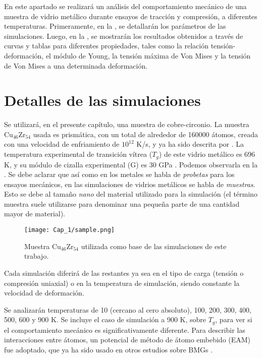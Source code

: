 En este apartado se realizará un análisis del comportamiento mecánico de una muestra de vidrio metálico durante ensayos de tracción y compresión, a diferentes temperaturas. Primeramente, en la , se detallarán los parámetros de las simulaciones. Luego, en la , se mostrarán los resultados obtenidos a través de curvas y tablas para diferentes propiedades, tales como la relación tensión-deformación, el módulo de Young, la tensión máxima de Von Mises y la tensión de Von Mises a una determinada deformación.

\section{Detalles de las simulaciones}
\label{S3_2}

Se utilizará, en el presente capítulo, una muestra de cobre-circonio. La muestra Cu$_{46}$Zr$_{54}$ usada es prismática, con un total de alrededor de 160000 átomos, creada con una velocidad de enfriamiento de $10^{12}$ K/s, y ya ha sido descrita por \cite{arman10}. La temperatura experimental de transición vítrea ($T_g$) de este vidrio metálico es 696 K, y su módulo de cizalla experimental (G) es 30 GPa \citep{johnson05}. Podemos observarla en la . Se debe aclarar que así como en los metales se habla de \textit{probetas} para los ensayos mecánicos, en las simulaciones de vidrios metálicos se habla de \textit{muestras}. Esto se debe al tamaño \textit{nano} del material utilizado para la simulación (el término muestra suele utilizarse para denominar una pequeña parte de una cantidad mayor de material).

\begin{figure}
 \centering
 \texttt{[image: Cap\_1/sample.png]}
 \caption[Muestra utilizada en el trabajo]{Muestra Cu$_{46}$Zr$_{54}$ utilizada como base de las simulaciones de este trabajo.}
 \label{C3:fg:sample}
\end{figure}

Cada simulación diferirá de las restantes ya sea en el tipo de carga (tensión o compresión uniaxial) o en la temperatura de simulación, siendo constante la velocidad de deformación.

Se analizarán temperaturas de 10 (cercano al cero absoluto), 100, 200, 300, 400, 500, 600 y 900 K. Se incluye el caso de simulación a 900 K, sobre $T_g$, para ver si el comportamiento mecánico es significativamente diferente. Para describir las interacciones entre átomos, un potencial de método de átomo embebido (EAM) \citep{daw84} fue adoptado, que ya ha sido usado en otros estudios sobre BMGs \citep{shimizu07,cao09,cheng08,arman10,cheng11,wang12}.

